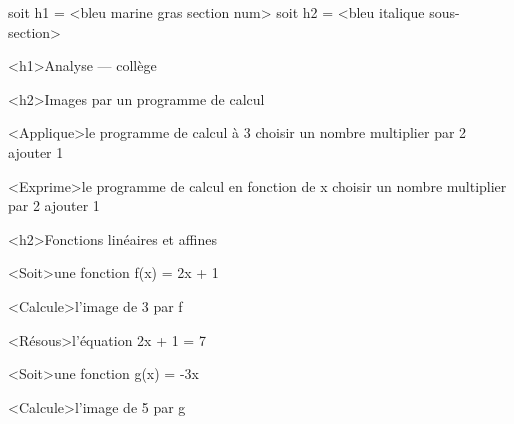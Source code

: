 \documentclass[marges=20, taille=11, precision=3]{texecole}
\begin{document}
soit h1 = <bleu marine gras section num>
soit h2 = <bleu italique sous-section>

<h1>Analyse — collège

<h2>Images par un programme de calcul

<Applique>le programme de calcul à 3 {
	choisir un nombre
	multiplier par 2
	ajouter 1
}

<Exprime>le programme de calcul en fonction de x {
	choisir un nombre
	multiplier par 2
	ajouter 1
}

<h2>Fonctions linéaires et affines

<Soit>une fonction f(x) = 2x + 1

<Calcule>l'image de 3 par f

<Résous>l'équation 2x + 1 = 7

<Soit>une fonction g(x) = -3x

<Calcule>l'image de 5 par g
\end{document}
